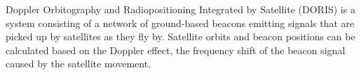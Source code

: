 Doppler Orbitography and Radiopositioning Integrated by Satellite (DORIS) is a
system consisting of a network of ground-based beacons emitting signals that are
picked up by satellites as they fly by. Satellite orbits and beacon positions
can be calculated based on the Doppler effect, the frequency shift of the beacon
signal caused by the satellite movement.

\endinput
